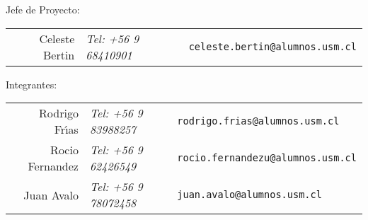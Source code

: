 \begin{titlepage}
\vfill
\begin{flushleft} %
  Jefe de Proyecto: 
  \begin{table}[H]
    \centering
    \begin{tabular}{rll}
      Celeste Bertin     & \emph{Tel: +56 9 68410901} & \texttt{\small celeste.bertin@alumnos.usm.cl}  \\
    \end{tabular}          
  \end{table}              
  Integrantes:             
  \begin{table}[H]         
    \centering             
    \begin{tabular}{rll}   
      Rodrigo Fr\'{\i}as & \emph{Tel: +56 9 83988257} & \texttt{\small rodrigo.frias@alumnos.usm.cl}   \\
      Rocio Fernandez    & \emph{Tel: +56 9 62426549} & \texttt{\small rocio.fernandezu@alumnos.usm.cl}\\
      Juan Avalo         & \emph{Tel: +56 9 78072458} & \texttt{\small juan.avalo@alumnos.usm.cl}      \\
    \end{tabular}
  \end{table}
\end{flushleft}
\end{titlepage}

